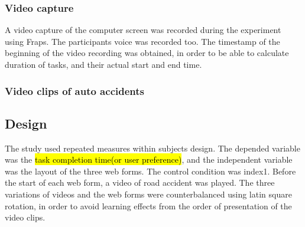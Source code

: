 \documentclass[a4paper]{report}
\begin{document}
			\subsubsection{Video capture}
			A video capture of the computer screen was recorded during the experiment using Fraps\cite{fraps}. The participants voice was recorded too. The timestamp of the beginning of the video recording was obtained, in order to be able to calculate duration of tasks, and their actual start and end time.
			\subsubsection{Video clips of auto accidents}
			
		\subsection{Design}
		The study used repeated measures within subjects design. The depended variable was the \hl{task completion time(or user preference)}, and the independent variable was the layout of the three web forms. The control condition was index1. Before the start of each web form, a video of road accident was played. The three variations of videos and the web forms were counterbalanced using latin square rotation, in order to avoid learning effects from the order of presentation of the video clips.
\end{document}
